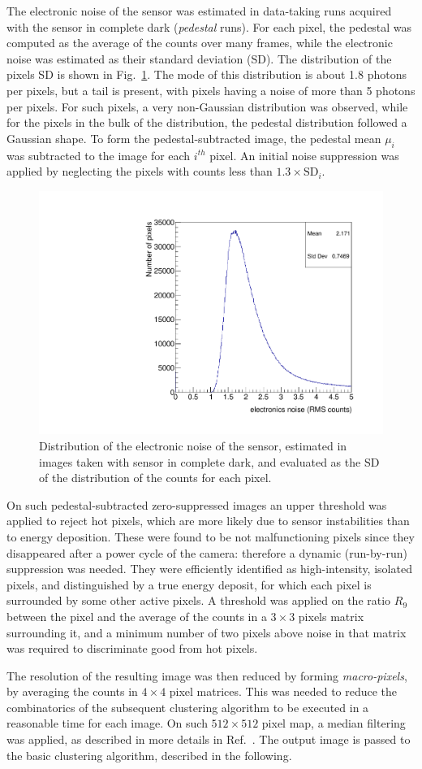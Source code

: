 The electronic noise of the sensor was estimated in data-taking runs acquired with
the sensor in complete dark ({\it pedestal} runs). For each pixel, the
pedestal was computed as the average of the counts over many frames,
while the electronic noise was estimated as their standard deviation
(SD). The distribution of the pixels SD is shown in
Fig.~\ref{fig:noise}. The mode of this distribution is about 1.8
photons per pixels, but a tail is present, with pixels having a noise
of more than 5 photons per pixels. For such pixels, a very
non-Gaussian distribution was observed, while for the pixels in the
bulk of the distribution, the pedestal distribution followed a Gaussian
shape. To form the pedestal-subtracted image, the pedestal mean
$\mu_i$ was subtracted to the image for each $i^{th}$ pixel.  An initial
noise suppression was applied by neglecting the pixels with counts less
than $1.3\times\textrm{SD}_i$.
%
\begin{figure}[ht]
  \centering
  \includegraphics[width=0.45\linewidth]{figures/sensor_noise}
  \caption{Distribution of the electronic noise of the sensor,
    estimated in images taken with sensor in complete dark, and
    evaluated as the SD of the distribution of the counts for each
    pixel.  \label{fig:noise}}
\end{figure}
%
On such pedestal-subtracted zero-suppressed images an upper threshold
was applied to reject hot pixels, which are more likely due to sensor
instabilities than to energy deposition. These were found  to be not
malfunctioning pixels since they disappeared after a power cycle of the
camera: therefore a dynamic (run-by-run) suppression was needed.
They were efficiently identified as high-intensity, isolated pixels,
and distinguished by a true energy deposit, for which each pixel is
surrounded by some other active pixels. A threshold was applied on the
ratio $R_9$ between the pixel and the average of the counts in a
$3\times3$ pixels matrix surrounding it, and a minimum number of two
pixels above noise in that matrix was required to discriminate  good from
hot pixels.

The resolution of the resulting image was then reduced by forming
\textit{macro-pixels}, by averaging the counts in $4\times4$ pixel
matrices. This was needed to reduce the combinatorics   of the subsequent
clustering algorithm to be executed   in a reasonable time for each
image. On such $512\times512$ pixel map, a median
filtering~\cite{medianfilter} was applied, as described in more details
in Ref.~\cite{medianfilter_cygno}. The output image is passed to the
basic clustering algorithm, described in the following.


